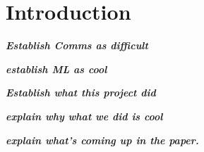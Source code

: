 \chapter{Introduction}


\par \textbf{\textit {Establish Comms as difficult}}
\par \textbf{\textit{establish ML as cool}}
\par \textbf{\textit{Establish what this project did}}
\par \textbf{\textit{explain why what we did is cool}}
\par \textbf{\textit{explain what's coming up in the paper.}}